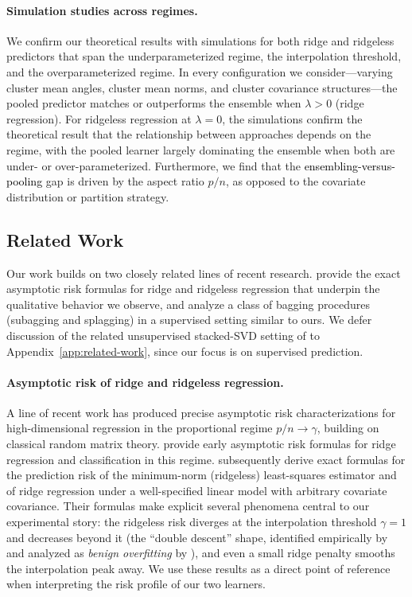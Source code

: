 \documentclass{article}
\theoremstyle{plain}
\theoremstyle{remark}
\begin{document}
\paragraph{Simulation studies across regimes.} We confirm our theoretical results with simulations for both ridge and ridgeless predictors that span the underparameterized regime, the interpolation threshold, and the overparameterized regime. In every configuration we consider\textcolor{black}{---}varying cluster mean angles, cluster mean norms, and cluster covariance structures\textcolor{black}{---}the pooled predictor matches or outperforms the ensemble when $\lambda > 0$ (ridge regression). For ridgeless regression at $\lambda = 0$, the simulations confirm the theoretical result that the relationship between approaches depends on the regime, with the pooled learner largely dominating the ensemble when both are under- or over-parameterized. Furthermore, we find that the \textcolor{black}{ensembling-versus-pooling} gap is driven by the aspect ratio $p/n$, as opposed to the covariate distribution or partition strategy.




\subsection{Related Work}
\label{sec:related-work}

Our work builds on two closely related lines of recent research. \citet{hastie2022surprises} provide the exact asymptotic risk formulas for ridge and ridgeless regression that underpin the qualitative behavior we observe, and \citet{patil2023bagging} analyze a class of bagging procedures (subagging and splagging) in a supervised setting similar to ours. We defer discussion of the related unsupervised stacked-SVD setting of \citet{baharav2025stackedsvd} to Appendix~\ref{app:related-work}, since our focus is on supervised prediction.

\paragraph{Asymptotic risk of ridge and ridgeless regression.}
A line of recent work has produced precise asymptotic risk characterizations for high-dimensional regression in the proportional regime $p/n \to \gamma$, building on classical random matrix theory. \citet{dobriban2018high} provide early asymptotic risk formulas for ridge regression and classification in this regime. \citet{hastie2022surprises} subsequently derive exact formulas for the prediction risk of the minimum-norm (ridgeless) least-squares estimator and of ridge regression under a well-specified linear model with arbitrary covariate covariance. Their formulas make explicit several phenomena central to our experimental story: the ridgeless risk diverges at the interpolation threshold $\gamma = 1$ and decreases beyond it (the ``double descent'' shape, identified empirically by \citet{belkin2019reconciling} and analyzed as \emph{benign overfitting} by \citet{bartlett2020benign}), and even a small ridge penalty smooths the interpolation peak away. We use these results as a direct point of reference when interpreting the risk profile of our two learners.
\end{document}
